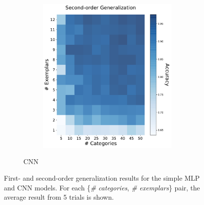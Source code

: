 \begin{figure}[h]
\begin{center}
\begin{subfigure}[b]{0.47\textwidth}
\begin{center}
\begin{subfigure}[b]{0.48\textwidth}
\begin{center}
                        \includegraphics[width=\textwidth]{figures/cnn_2order_accuracy.pdf}
                    \end{center}
                \end{subfigure}
            \end{center}
            \caption{CNN}
            \label{fig:cnn_results}
        \end{subfigure}
    \end{center}
    \caption{First- and second-order generalization results for the simple MLP
    and CNN models. For each \{\textit{\# categories}, \textit{\# exemplars}\}
    pair, the average result from 5 trials is shown.}
    \label{fig:generalization_results}
\end{figure}